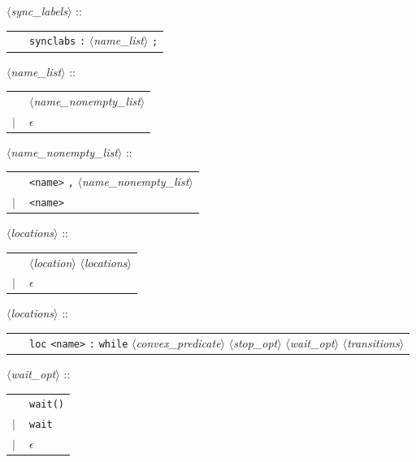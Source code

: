 \documentclass[a4paper,11pt]{report}
\newcommand{\emptystring}{$\epsilon$}
\newcommand{\nt}[1]{$\langle$\emph{#1}$\rangle$}
\newcommand{\regleGrammaire}[1]{\bigskip \noindent \nt{#1} :: \\}
\newcommand{\npec}[1]{\textcolor{green!50!black}{#1}}
\newcommand{\styleIMI}[1]{\textcolor{imicolor}{\texttt{#1}}}
\begin{document}
\regleGrammaire{sync\_labels}
\begin{tabular}{l l}
	\  & \styleIMI{synclabs} \styleIMI{:} \nt{name\_list} \styleIMI{;} \\
\end{tabular}

\regleGrammaire{name\_list}
\begin{tabular}{l l}
	\  & \nt{name\_nonempty\_list} \\
	$|$ & \emptystring \\
\end{tabular}

\regleGrammaire{name\_nonempty\_list}
\begin{tabular}{l l}
	\  & \styleIMI{<name>} \styleIMI{,} \nt{name\_nonempty\_list} \\
	$|$ & \styleIMI{<name>} \\
\end{tabular}

\regleGrammaire{locations}
\begin{tabular}{l l}
	\  & \nt{location} \nt{locations} \\
	$|$ & \emptystring \\
\end{tabular}

\regleGrammaire{locations}
\begin{tabular}{l l}
	\  & \styleIMI{loc} \styleIMI{<name>} \styleIMI{:} \styleIMI{while} \nt{convex\_predicate} \nt{stop\_opt} \npec{\nt{wait\_opt}} \nt{transitions} \\
\end{tabular}

\regleGrammaire{wait\_opt}
\begin{tabular}{l l}
	\ & \npec{\styleIMI{wait()}} \\
	$|$ & \npec{\styleIMI{wait}} \\
	$|$ & \npec{\emptystring} \\
\end{tabular}
\end{document}
